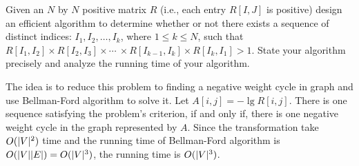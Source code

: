 \begin{Exercise}[origin={NCTU CSIE 96},title={Arbitrage}]
Given an $N$ by $N$ positive matrix $R$ (i.e., each entry $R[I, J]$ is positive) design an efficient algorithm to determine whether or not there exists a sequence of distinct indices: $I_1, I_2, \dots, I_k$, where $1 \leq k \leq N$, such that $ R[I_1, I_2] \times R[I_2, I_3] \times \cdots \ \times R[I_{k-1}, I_k] \times R[I_k, I_1] > 1$. State your algorithm precisely and analyze the running time of your algorithm. 
\end{Exercise}
\begin{Answer}
The idea is to reduce this problem to finding a negative weight cycle in graph and use Bellman-Ford algorithm to solve it. Let $A[i, j] = - \lg R[i, j]$.  There is one sequence satisfying the problem's criterion, if and only if, there is one negative weight cycle in the graph represented by $A$. Since the transformation take $O(\lvert V\rvert^2)$ time and the running time of Bellman-Ford algorithm is $O(\lvert V\rvert\lvert E\rvert) = O(\lvert V\rvert^3)$, the running time is $O(\lvert V\rvert^3)$.
\end{Answer}

